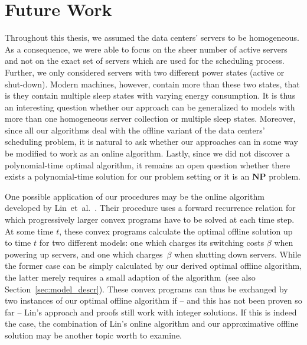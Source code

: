 \section{Future Work}
Throughout this thesis, we assumed the data centers' servers to be homogeneous. As a consequence, we were able to focus on the sheer number of active servers and not on the exact set of servers which are used for the scheduling process. Further, we only considered servers with two different power states (active or shut-down). Modern machines, however, contain more than these two states, that is they contain multiple sleep states with varying energy consumption. It is thus an interesting question whether our approach can be generalized to models with more than one homogeneous server collection or multiple sleep states. 
Moreover, since all our algorithms deal with the offline variant of the data centers' scheduling problem, it is natural to ask whether our approaches can in some way be modified to work as an online algorithm. Lastly, since we did not discover a polynomial-time optimal algorithm, it remains an open question whether there exists a polynomial-time solution for our problem setting or it is an $\textbf{NP}$ problem.

One possible application of our procedures may be the online algorithm developed by Lin~et~al.~\parencite{dyn-right-sizing}. Their procedure uses a forward recurrence relation for which progressively larger convex programs have to be solved at each time step. At some time $t$, these convex programs calculate the optimal offline solution up to time $t$ for two different models: one which charges its switching costs $\beta$ when powering up servers, and one which charges~$\beta$ when shutting down servers. While the former case can be simply calculated by our derived optimal offline algorithm, the latter merely requires a small adaption of the algorithm~(see also Section~\ref{sec:model_descr}). These convex programs can thus be exchanged by two instances of our optimal offline algorithm if -- and this has not been proven so far -- Lin's approach and proofs still work with integer solutions. If this is indeed the case, the combination of Lin's online algorithm and our approximative offline solution may be another topic worth to examine.
